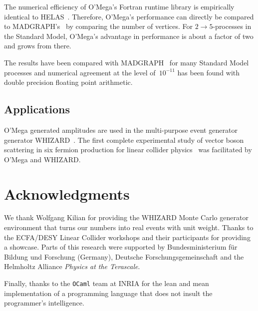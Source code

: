 \documentclass[12pt,a4paper]{article}
\def\OCaml/{\texttt{OCaml}}
\begin{document}
The numerical efficiency of O'Mega's Fortran runtime library is
empirically identical to HELAS~\cite{HELAS}. Therefore, O'Mega's
performance can directly be compared to
MADGRAPH's~\cite{MADGRAPH} by comparing the number of vertices.
For $2\to5$-processes in the Standard Model, O'Mega's advantage in
performance is about a factor of two and grows from there.

The results have been compared with MADGRAPH~\cite{MADGRAPH} for
many Standard Model processes and numerical agreement at the level
of~$10^{-11}$ has been found with double precision floating point
arithmetic.

\subsection{Applications}
O'Mega generated amplitudes are used in the multi-purpose
event generator generator WHIZARD~\cite{WHIZARD}.  The first
complete experimental study of vector boson scattering in six fermion
production for linear collider
physics~\cite{Chierici/Kobel/Rosati:2000:TDR-backup} was
facilitated by O'Mega and WHIZARD.

\section*{Acknowledgments}
We thank Wolfgang Kilian for providing the WHIZARD Monte Carlo
generator environment that turns our numbers into real events with
unit weight.  Thanks to the ECFA/DESY Linear Collider workshops and
their participants for providing a showcase.  Parts of this research
were supported by Bundesministerium f\"ur Bildung und Forschung
(Germany), Deutsche Forschungsgemeinschaft and the Helmholtz Alliance
\textit{Physics at the Terascale}.

Finally, thanks to the \OCaml/ team at INRIA for the
lean and mean implementation of a programming language that does not
insult the programmer's intelligence.
\end{document}
